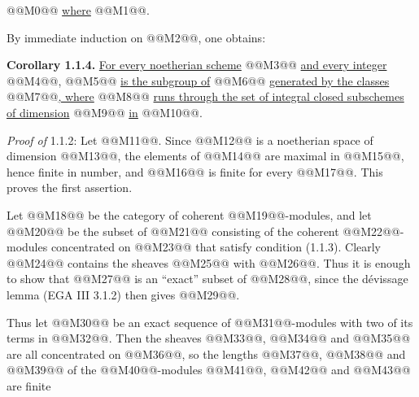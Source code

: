 
@@M0@@
\uline{where} @@M1@@.

By immediate induction on @@M2@@, one obtains:

\textbf{Corollary 1.1.4.} \uline{For every noetherian scheme} @@M3@@ \uline{and every integer} @@M4@@, @@M5@@ \uline{is the subgroup of} @@M6@@ \uline{generated by the classes} @@M7@@\uline{, where} @@M8@@ \uline{runs through the set of integral closed subschemes of dimension} @@M9@@ \uline{in} @@M10@@.

\emph{Proof of} 1.1.2: Let @@M11@@. Since @@M12@@ is a noetherian space of dimension @@M13@@, the elements of @@M14@@ are maximal in @@M15@@, hence finite in number, and @@M16@@ is finite for every @@M17@@. This proves the first assertion.

Let @@M18@@ be the category of coherent @@M19@@-modules, and let @@M20@@ be the subset of @@M21@@ consisting of the coherent @@M22@@-modules concentrated on @@M23@@ that satisfy condition (1.1.3). Clearly @@M24@@ contains the sheaves @@M25@@ with @@M26@@. Thus it is enough to show that @@M27@@ is an ``exact'' subset of @@M28@@, since the dévissage lemma (EGA III 3.1.2) then gives @@M29@@.

Thus let
@@M30@@
be an exact sequence of @@M31@@-modules with two of its terms in @@M32@@. Then the sheaves @@M33@@, @@M34@@ and @@M35@@ are all concentrated on @@M36@@, so the lengths @@M37@@, @@M38@@ and @@M39@@ of the @@M40@@-modules @@M41@@, @@M42@@ and @@M43@@ are finite

